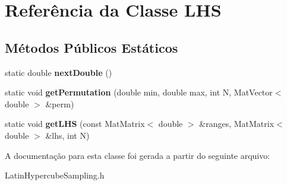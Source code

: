\hypertarget{class_l_h_s}{\section{Referência da Classe L\-H\-S}
\label{class_l_h_s}
}
\subsection*{Métodos Públicos Estáticos}
\begin{DoxyCompactItemize}
\item 
\hypertarget{class_l_h_s_abdb4b724cd2d18b4a54fad05fbab245f}{static double {\bfseries next\-Double} ()}\label{class_l_h_s_abdb4b724cd2d18b4a54fad05fbab245f}

\item 
\hypertarget{class_l_h_s_a4c2b5159b4076b4f072d3c67d46eddfa}{static void {\bfseries get\-Permutation} (double min, double max, int N, Mat\-Vector$<$ double $>$ \&perm)}\label{class_l_h_s_a4c2b5159b4076b4f072d3c67d46eddfa}

\item 
\hypertarget{class_l_h_s_a0f592b00e11c6c7b202aeb92d498ccec}{static void {\bfseries get\-L\-H\-S} (const Mat\-Matrix$<$ double $>$ \&ranges, Mat\-Matrix$<$ double $>$ \&lhs, int N)}\label{class_l_h_s_a0f592b00e11c6c7b202aeb92d498ccec}

\end{DoxyCompactItemize}


A documentação para esta classe foi gerada a partir do seguinte arquivo\-:\begin{DoxyCompactItemize}
\item 
Latin\-Hypercube\-Sampling.\-h\end{DoxyCompactItemize}
